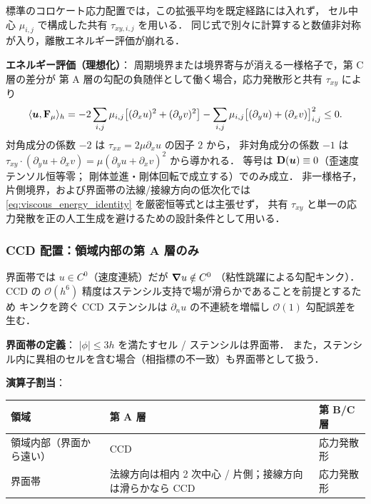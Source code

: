 標準のコロケート応力配置では，この拡張平均を既定経路には入れず，
セル中心 $\mu_{i,j}$ で構成した共有 $\tau_{xy,i,j}$ を用いる．
同じ式で別々に計算すると数値非対称が入り，離散エネルギー評価が崩れる．

\noindent\textbf{エネルギー評価（理想化）}：
周期境界または境界寄与が消える一様格子で，第 C 層の差分が
第 A 層の勾配の負随伴として働く場合，応力発散形と共有 $\tau_{xy}$ により
\begin{equation}
  \langle\bm{u},\mathbf{F}_\mu\rangle_h
  = -2\sum_{i,j}\mu_{i,j}\bigl[(\partial_x u)^2+(\partial_y v)^2\bigr]
  - \sum_{i,j}\mu_{i,j}\bigl[(\partial_y u) + (\partial_x v)\bigr]^2_{i,j}
  \le 0.
  \label{eq:viscous_energy_identity}
\end{equation}
対角成分の係数 $-2$ は $\tau_{xx}=2\mu\partial_x u$ の因子 $2$ から，
非対角成分の係数 $-1$ は $\tau_{xy}\cdot(\partial_y u + \partial_x v)
= \mu(\partial_y u + \partial_x v)^2$ から導かれる．
等号は $\mathbf{D}(\bm{u})\equiv 0$（歪速度テンソル恒等零；
剛体並進・剛体回転で成立する）でのみ成立．
非一様格子，片側境界，および界面帯の法線/接線方向の低次化では
\eqref{eq:viscous_energy_identity} を厳密恒等式とは主張せず，
共有 $\tau_{xy}$ と単一の応力発散を正の人工生成を避けるための設計条件として用いる．

\subsubsection{CCD 配置：領域内部の第 A 層のみ}
\label{sec:viscous_ccd_placement}

界面帯では $u\in C^0$（速度連続）だが $\bm{\nabla} u\notin C^0$
（粘性跳躍による勾配キンク）．
CCD の $\mathcal{O}(h^6)$ 精度はステンシル支持で場が滑らかであることを前提とするため
キンクを跨ぐ CCD ステンシルは $\partial_n u$ の不連続を増幅し
$\mathcal{O}(1)$ 勾配誤差を生む．

\noindent\textbf{界面帯の定義}：
$|\phi|\le 3h$ を満たすセル / ステンシルは界面帯．
また，ステンシル内に異相のセルを含む場合（相指標の不一致）も界面帯として扱う．

\noindent\textbf{演算子割当}：
\begin{center}
\begin{tabular}{@{}lll@{}}
\hline
領域 & 第 A 層 & 第 B/C 層 \\
\hline
領域内部（界面から遠い）& CCD & 応力発散形 \\
界面帯 & 法線方向は相内 2 次中心 / 片側；接線方向は滑らかなら CCD & 応力発散形 \\
\hline
\end{tabular}
\end{center}

